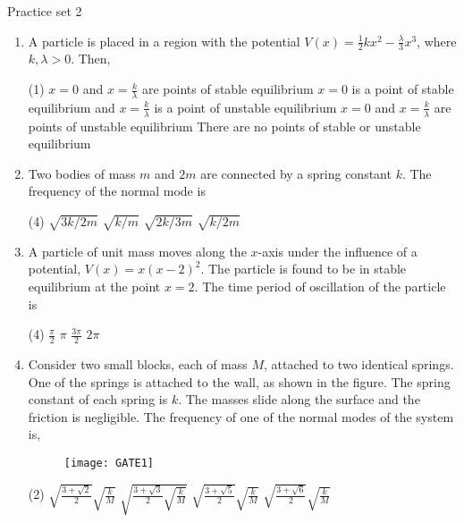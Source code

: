 \newpage
\begin{abox}
	Practice set 2 
	\end{abox}
\begin{enumerate}

	\item A particle is placed in a region with the potential $V(x)=\frac{1}{2} k x^{2}-\frac{\lambda}{3} x^{3}$, where $k, \lambda>0$.
	Then,
	{}
\begin{tasks}(1)
	\task[\textbf{A.}] $x=0$ and $x=\frac{k}{\lambda}$ are points of stable equilibrium
	\task[\textbf{B.}]$x=0$ is a point of stable equilibrium and $x=\frac{k}{\lambda}$ is a point of unstable equilibrium
	\task[\textbf{C.}]$x=0$ and $x=\frac{k}{\lambda}$ are points of unstable equilibrium
	\task[\textbf{D.}]There are no points of stable or unstable equilibrium
\end{tasks}

	\item Two bodies of mass $m$ and $2 m$ are connected by a spring constant $k$. The frequency of the normal mode is
	{}
\begin{tasks}(4)
	\task[\textbf{A.}] $\sqrt{3 k / 2 m}$
	\task[\textbf{B.}]$\sqrt{k / m}$
	\task[\textbf{C.}] $\sqrt{2 k / 3 m}$
	\task[\textbf{D.}]$\sqrt{k / 2 m}$
\end{tasks}
	\item A particle of unit mass moves along the $x$-axis under the influence of a potential, $V(x)=x(x-2)^{2}$. The particle is found to be in stable equilibrium at the point $x=2$. The time period of oscillation of the particle is
	{}
\begin{tasks}(4)
	\task[\textbf{A.}] $\frac{\pi}{2}$
	\task[\textbf{B.}]$\pi$
	\task[\textbf{C.}]$\frac{3 \pi}{2}$
	\task[\textbf{D.}]$2 \pi$
\end{tasks}

	\item Consider two small blocks, each of mass $M$, attached to two identical springs. One of the springs is attached to the wall, as shown in the figure. The spring constant of each spring is $k$. The masses slide along the surface and the friction is negligible. The frequency of one of the normal modes of the system is,
{	}
	\begin{figure}[H]
		\centering
		\texttt{[image: GATE1]}
	\end{figure}
\begin{tasks}(2)
	\task[\textbf{A.}] $\sqrt{\frac{3+\sqrt{2}}{2}} \sqrt{\frac{k}{M}}$
	\task[\textbf{B.}]$\sqrt{\frac{3+\sqrt{3}}{2} \sqrt{\frac{k}{M}}}$
	\task[\textbf{C.}]$\sqrt{\frac{3+\sqrt{5}}{2}} \sqrt{\frac{k}{M}}$
	\task[\textbf{D.}]$\sqrt{\frac{3+\sqrt{6}}{2}} \sqrt{\frac{k}{M}}$
\end{tasks}


\end{enumerate}
